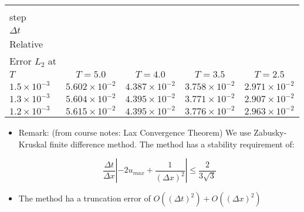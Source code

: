 \documentclass[12pt]{article}
\begin{document}
\centering
\begin{tabular}{|l|c|c|c|c|   }\hline
\diagbox[width=9em]{Time\\step\\$\Delta t$}{\\Relative\\Error $L_{2}$ at\\$T$ }&
  $T=5.0$ & $T=4.0$ & $T=3.5$ & $T=2.5$ \\ \hline
 $1.5 \times 10^{-3}$ & $5.602 \times 10^{-2}$ & $4.387 \times 10^{-2}$ & $3.758 \times 10^{-2}$ & $2.971 \times 10^{-2}$ \\ \hline
 $1.3 \times 10^{-3} $ & $5.604 \times 10^{-2}$ & $4.395 \times 10^{-2}$ & $3.771 \times 10^{-2}$ & $2.907 \times 10^{-2}$ \\ \hline
 $1.2\times 10^{-3}$ & $5.615 \times 10^{-2}$ & $4.395 \times 10^{-2}$ & $3.776 \times 10^{-2}$ & $2.963 \times 10^{-2}$ \\ \hline
\end{tabular}




\begin{itemize}
    \item Remark: (from course notes: Lax Convergence Theorem) We use Zabusky-Kruskal finite difference method. The method has a stability requirement of:
    
    
    \begin{equation}
        \frac{\Delta t}{\Delta x} |-2 u_{max} + \frac{1}{(\Delta x)^{2}}          |\leq \frac{2}{3 \sqrt{3}}
    \end{equation}
    
    \item The method ha a truncation error of $O( (\Delta t)^{2}  ) + O( (\Delta x)^{2}  )$
\end{itemize}
\end{document}
